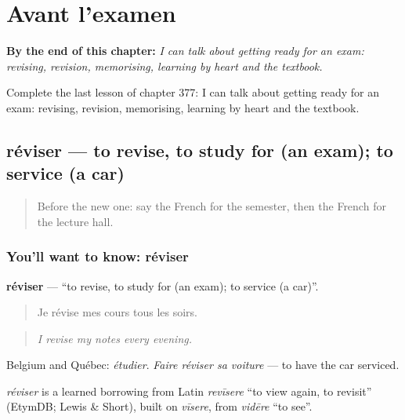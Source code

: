 
\chapter{Avant l'examen}
\label{ch:fr-avant-l-examen}

\begin{chapteropening}
\textbf{By the end of this chapter:} \emph{I can talk about getting ready for an exam: revising, revision, memorising, learning by heart and the textbook.}

Complete the last lesson of chapter 377: I can talk about getting ready for an exam: revising, revision, memorising, learning by heart and the textbook.
\end{chapteropening}

\section[réviser]{réviser — to revise, to study for (an exam); to service (a car)}

\label{lesson:FR-C377-reviser}



\begin{quote}
Before the new one: say the French for the semester, then the French for the lecture hall.
\end{quote}

\subsection*{You'll want to know: réviser}
\textbf{réviser} — \textquotedblleft{}to revise, to study for (an exam); to service (a car)\textquotedblright{}.

\begin{quote}
Je révise mes cours tous les soirs.
\end{quote}

\begin{quote}
\emph{I revise my notes every evening.}
\end{quote}

Belgium and Québec: \emph{étudier}. \emph{Faire réviser sa voiture} — to have the car serviced.

\begin{cousinweb}
\emph{réviser} is a learned borrowing from Latin \emph{revīsere} \textquotedblleft{}to view again, to revisit\textquotedblright{} (EtymDB; Lewis \& Short), built on \emph{vīsere}, from \emph{vidēre} \textquotedblleft{}to see\textquotedblright{}.
\end{cousinweb}

